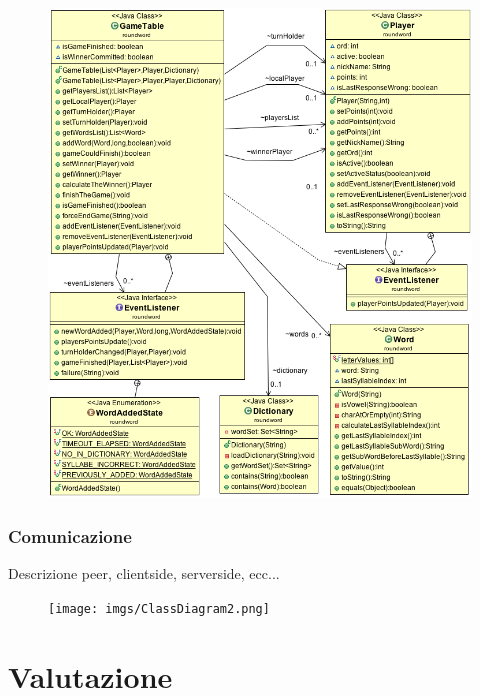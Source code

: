 \documentclass[10.5pt]{article}
\begin{document}
\begin{figure}
	\begin{center}
		\includegraphics[scale=0.5]{imgs/ClassDiagram1.png}
		\caption{}
	\end{center}
\end{figure}

\subsubsection{Comunicazione}

Descrizione peer, clientside, serverside, ecc...

\begin{figure}
	\begin{center}
		\texttt{[image: imgs/ClassDiagram2.png]}
		\caption{}
	\end{center}
\end{figure}



\section{Valutazione}
\end{document}

